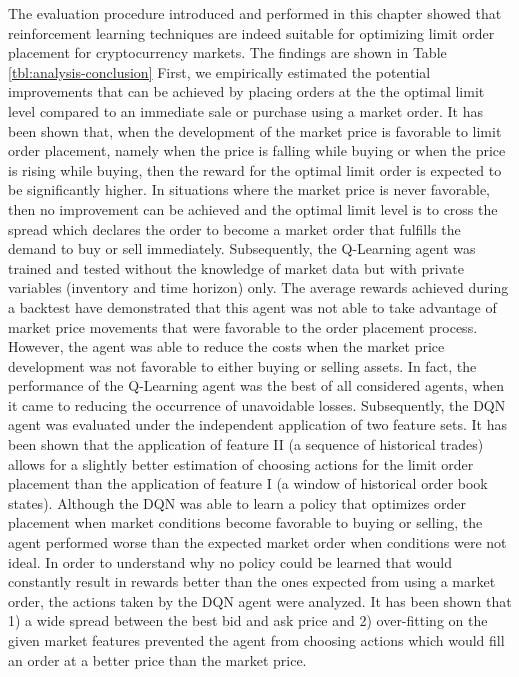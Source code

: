 The evaluation procedure introduced and performed in this chapter showed that reinforcement learning techniques are indeed suitable for optimizing limit order placement for cryptocurrency markets.
The findings are shown in Table \ref{tbl:analysis-conclusion}
First, we empirically estimated the potential improvements that can be achieved by placing orders at the the optimal limit level compared to an immediate sale or purchase using a market order.
It has been shown that, when the development of the market price is favorable to limit order placement, namely when the price is falling while buying or when the price is rising while buying, then the reward for the optimal limit order is expected to be significantly higher.
In situations where the market price is never favorable, then no improvement can be achieved and the optimal limit level is to cross the spread which declares the order to become a market order that fulfills the demand to buy or sell immediately.
Subsequently, the Q-Learning agent was trained and tested without the knowledge of market data but with private variables (inventory and time horizon) only.
The average rewards achieved during a backtest have demonstrated that this agent was not able to take advantage of market price movements that were favorable to the order placement process.
However, the agent was able to reduce the costs when the market price development was  not favorable to either buying or selling assets.
In fact, the performance of the Q-Learning agent was the best of all considered agents, when it came to reducing the occurrence of unavoidable losses.
Subsequently, the DQN agent was evaluated under the independent application of two feature sets.
It has been shown that the application of feature II (a sequence of historical trades) allows for a slightly better estimation of choosing actions for the limit order placement than the application of feature I (a window of historical order book states).
Although the DQN was able to learn a policy that optimizes order placement when market conditions become favorable to buying or selling, the agent performed worse than the expected market order when conditions were not ideal.
In order to understand why no policy could be learned that would constantly result in rewards better than the ones expected from using a market order, the actions taken by the DQN agent were analyzed.
It has been shown that 1) a wide spread between the best bid and ask price and 2) over-fitting on the given market features prevented the agent from choosing actions which would fill an order at a better price than the market price.
